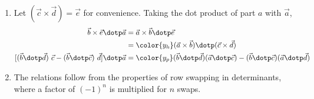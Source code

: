 \begin{enumerate}
\begin{enumerate}
              \item Let $ (\vec{c} \times \vec{d}) = \vec{e} $ for convenience. Taking
                    the dot product of part $ a $ with $ \vec{a} $,
                    \begin{align}
                        \vec{b} \times \vec{e} \dotp \vec{a}            & =
                        \vec{a} \times \vec{b} \dotp \vec{e}                \\
                                                                        & =
                        \color{y_h} (\vec{a} \times \vec{b}) \dotp
                        (\vec{c} \times \vec{d})                            \\
                        [(\vec{b} \dotp \vec{d})\ \vec{c} -
                        (\vec{b} \dotp \vec{c})\ \vec{d}] \dotp \vec{a} & =
                        \color{y_p} (\vec{b} \dotp \vec{d})(\vec{a} \dotp \vec{c}) -
                        (\vec{b} \dotp \vec{c})(\vec{a} \dotp \vec{d})
                    \end{align}

              \item The relations follow from the properties of row swapping in
                    determinants, where a factor of $ (-1)^n $ is multiplied for $ n $
                    swaps.
          \end{enumerate}


\end{enumerate}
